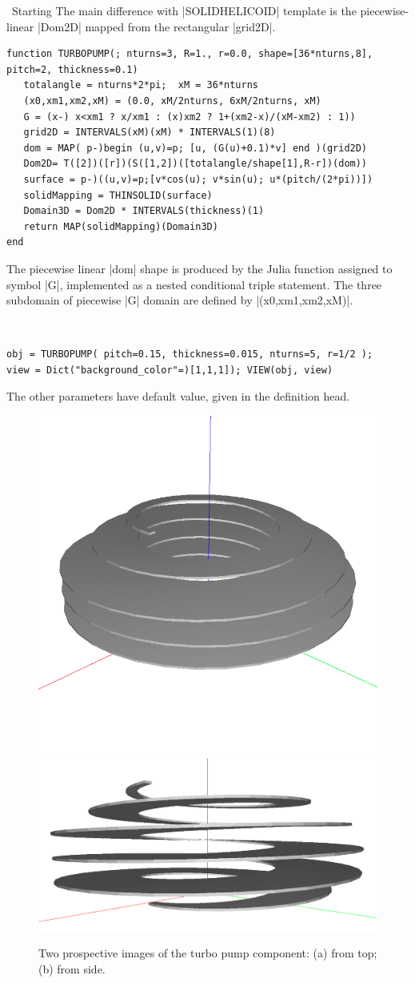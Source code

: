 \begin{coding}
\begin{coding}\ 
Starting
The main difference with |SOLIDHELICOID| template is the piecewise-linear |Dom2D| mapped from the rectangular |grid2D|.
\begin{lstlisting}[language=JuliaLocal, style=julia, mathescape=true]
function TURBOPUMP(; nturns=3, R=1., r=0.0, shape=[36*nturns,8], pitch=2, thickness=0.1)
   totalangle = nturns*2*pi;  xM = 36*nturns 
   (x0,xm1,xm2,xM) = (0.0, xM/2nturns, 6xM/2nturns, xM)
   G = (x-) x<xm1 ? x/xm1 : (x)xm2 ? 1+(xm2-x)/(xM-xm2) : 1))
   grid2D = INTERVALS(xM)(xM) * INTERVALS(1)(8)
   dom = MAP( p-)begin (u,v)=p; [u, (G(u)+0.1)*v] end )(grid2D)
   Dom2D= T([2])([r])(S([1,2])([totalangle/shape[1],R-r])(dom)) 
   surface = p-)((u,v)=p;[v*cos(u); v*sin(u); u*(pitch/(2*pi))]) 
   solidMapping = THINSOLID(surface)
   Domain3D = Dom2D * INTERVALS(thickness)(1)
   return MAP(solidMapping)(Domain3D)
end
\end{lstlisting}
\end{coding}

The piecewise linear |dom| shape is produced by the Julia function assigned to symbol |G|, implemented as a nested conditional triple statement. The three subdomain of piecewise |G| domain are defined by |(x0,xm1,xm2,xM)|.

\begin{coding}\ 
\begin{lstlisting}[language=JuliaLocal, style=julia, mathescape=true]
obj = TURBOPUMP( pitch=0.15, thickness=0.015, nturns=5, r=1/2 );
view = Dict("background_color"=)[1,1,1]); VIEW(obj, view)
\end{lstlisting}
The other parameters have default value, given in the definition head.
\end{coding}


\begin{figure}[htbp] %
   \includegraphics[width=0.337\linewidth]{chapter-04/figs/turbo-pump01}%
   \includegraphics[width=0.663\linewidth]{chapter-04/figs/turbo-pump02}%
\caption{Two prospective images of the turbo pump component: (a) from top; (b) from side.}
\label{fig:turbopump}
\end{figure}



\end{coding}
